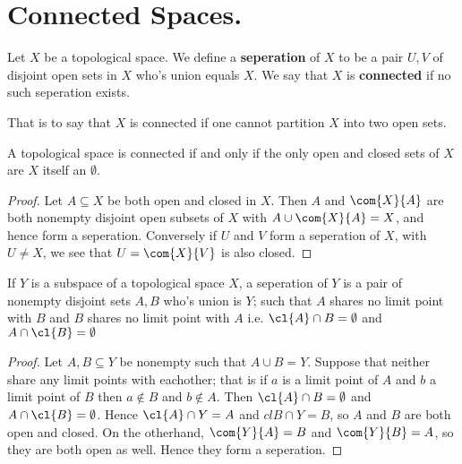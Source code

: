 
\section{Connected Spaces.}

\begin{definition}
    Let $X$ be a topological space. We define a  \textbf{seperation} of $X$ to be a pair $U,V$ of disjoint
    open sets in  $X$ who's union equals  $X$. We say that $X$ is \textbf{connected} if no such
    seperation exists.
\end{definition}

That is to say that $X$ is connected if one cannot partition  $X$ into two open sets.

\begin{lemma}\label{3.1.1}
    A topological space is connected if and only if the only open and closed sets of $X$ are  $X$
    itself an  $\emptyset$.
\end{lemma}
\begin{proof}
Let $A \subseteq X$ be both open and closed in $X$. Then $A$ and $\com{X}{A}$ are both nonempty
disjoint open subsets of $X$ with $A \cup \com{X}{A}=X$, and hence form a seperation. Conversely if
$U$ and  $V$ form a seperation of  $X$, with  $U \neq X$, we see that  $U=\com{X}{V}$ is also
closed.
\end{proof}

\begin{lemma}\label{3.1.2}
    If $Y$ is a subspace of a topological space  $X$, a seperation of  $Y$ is a pair of nonempty
    disjoint sets  $A,B$ who's union is $Y$; such that  $A$ shares no limit point with  $B$ and  $B$
    shares no limit point with  $A$ i.e.  $\cl{A} \cap B = \emptyset$ and $A \cap \cl{B}=\emptyset$
\end{lemma}
\begin{proof}
    Let $A,B \subseteq Y$ be nonempty such that  $A \cup B=Y$. Suppose that neither share any
    limit points with eachother; that is if $a$ is a limit point of $A$ and  $b$ a limit point of
    $B$ then  $a \notin B$ and  $b \notin A$. Then  $\cl{A} \cap B=\emptyset$ and $A \cap
    \cl{B}=\emptyset$. Hence $\cl{A} \cap Y=A$ and $cl{B} \cap Y=B$, so $A$ and  $B$ are both open
    and closed. On the otherhand,  $\com{Y}{A}=B$ and $\com{Y}{B}=A$, so they are both open as well.
    Hence they form a seperation.
\end{proof}

